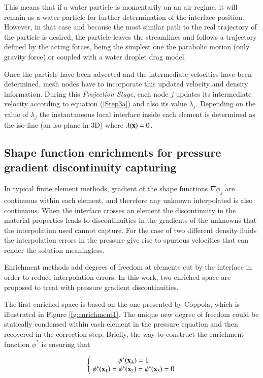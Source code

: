 This means that if a water particle is momentarily on an air regime, it will remain as a water particle for further determination of the interface position. However, in that case and because the most similar path to the real trajectory of the particle is desired, the particle leaves the streamlines and follows a trajectory defined by the acting forces, being the simplest one the parabolic motion (only gravity force) or coupled with a water droplet drag model.

Once the particle have been advected and the intermediate velocities have been determined, mesh nodes have to incorporate this updated velocity and density information. During this \textit{Projection Stage}, each node $j$ updates its intermediate velocity according to equation (\ref{Step3a}) and also its value $\lambda_j$. Depending on the value of $\lambda_j$ the instantaneous local interface inside each element is determined as the iso-line (an iso-plane in 3D) where $\lambda(\mathbf{x})=0$.

\subsection{Shape function enrichments for pressure gradient discontinuity capturing}

In typical finite element methods, gradient of the shape functions $\nabla\phi_j$ are continuous within each element, and therefore any unknown interpolated is also continuous. When the interface crosses an element the discontinuity in the material properties leads to discontinuities in the gradients of the unknowns that the interpolation used cannot capture. For the case of two different density fluids the interpolation errors in the pressure give rise to spurious velocities that can render the solution meaningless.

Enrichment methods add degrees of freedom at elements cut by the interface in order to reduce interpolation errors. In this work, two enriched space are proposed to treat with pressure gradient discontinuities. 

The first enriched space is based on the one presented by Coppola\cite{Coppola05}, which is illustrated in Figure \ref{fg:enrichment1}. The unique new degree of freedom could be statically condensed within each element in the pressure equation and then recovered in the correction step. Briefly, the way to construct the enrichment function $\phi^*$ is ensuring that

\begin{equation}
   \left\{\;
   \begin{matrix}
      \phi^*(\mathbf{x}_A)= 1 \\
      \phi^*(\mathbf{x}_1)= \phi^*(\mathbf{x}_2)=\phi^*(\mathbf{x}_3)= 0
   \end{matrix}\;
   \right.
   \label{eq:enrich-1a}
\end{equation}

